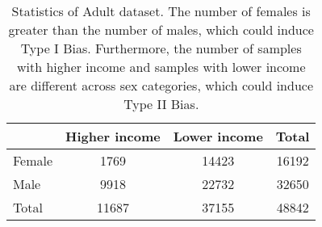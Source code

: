 \begin{table}[htbp]
\caption{Statistics of Adult dataset. The number of females is greater than the number of males, which could induce Type I Bias. Furthermore, the number of samples with higher income and samples with lower income are different across sex categories, which could induce Type II Bias.}
\label{tab:stats}
\centering
\begin{tabular}{lccc}
\toprule
       & Higher income & Lower income & Total \\
       \midrule
Female & 1769          & 14423        & 16192 \\
Male   & 9918          & 22732        & 32650 \\
Total  & 11687         & 37155        & 48842 \\
\bottomrule
\end{tabular}
\end{table}
